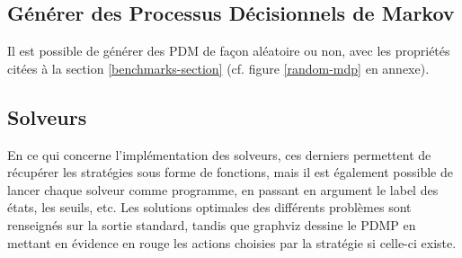 \documentclass[12pt,a4paper]{report}
\theoremstyle{definition}%
\theoremstyle{remark}
\begin{document}
\subsection{Générer des Processus Décisionnels de Markov}
Il est possible de générer des PDM de façon aléatoire ou non, avec les
propriétés citées à la section \ref{benchmarks-section} (cf. figure \ref{random-mdp} en annexe).

\subsection{Solveurs}
En ce qui concerne l'implémentation des solveurs, ces derniers permettent de
récupérer les stratégies sous forme de fonctions, mais il est également
possible de lancer chaque solveur comme programme, en passant en argument le
label des états, les seuils, etc.
Les solutions optimales des différents problèmes sont renseignés sur la sortie standard, tandis que graphviz dessine le PDMP en mettant en évidence en
rouge les actions choisies par la stratégie si celle-ci existe.
\end{document}
